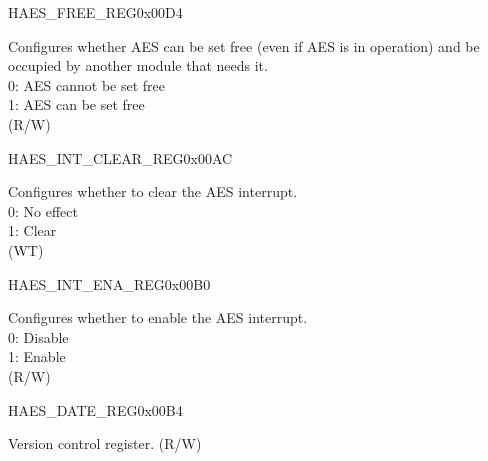\begin{register}{H}{AES\_FREE\_REG}{0x00D4}\label{regdesc:AESFREEREG}
%
%
\regnewline%
\begin{regdesc}\begin{reglist}
\label{fielddesc:AESFREE}\item [AES\_FREE] Configures whether AES can be set free (even if AES is in operation) and be occupied by another module that needs it.\\
0: AES cannot be set free\\
1: AES can be set free \\(R/W)
\end{reglist}\end{regdesc}
\end{register}


\begin{register}{H}{AES\_INT\_CLEAR\_REG}{0x00AC}\label{regdesc:AESINTCLEARREG}
%
%
\regnewline%
\begin{regdesc}\begin{reglist}
\label{fielddesc:AESINTCLEAR}\item [AES\_INT\_CLEAR] Configures whether to clear the AES interrupt. \\
0: No effect \\
1: Clear \\ (WT)
\end{reglist}\end{regdesc}
\end{register}


\begin{register}{H}{AES\_INT\_ENA\_REG}{0x00B0}\label{regdesc:AESINTENAREG}
%
%
\regnewline%
\begin{regdesc}\begin{reglist}
\label{fielddesc:AESINTENA}\item [AES\_INT\_ENA] Configures whether to enable the AES interrupt.\\
0: Disable\\
1: Enable \\ (R/W)
\end{reglist}\end{regdesc}
\end{register}


\begin{register}{H}{AES\_DATE\_REG}{0x00B4}\label{regdesc:AESDATEREG}
%
%
\regnewline%
\begin{regdesc}\begin{reglist}
\label{fielddesc:AESDATE}\item [AES\_DATE] Version control register. (R/W)
\end{reglist}\end{regdesc}
\end{register}
